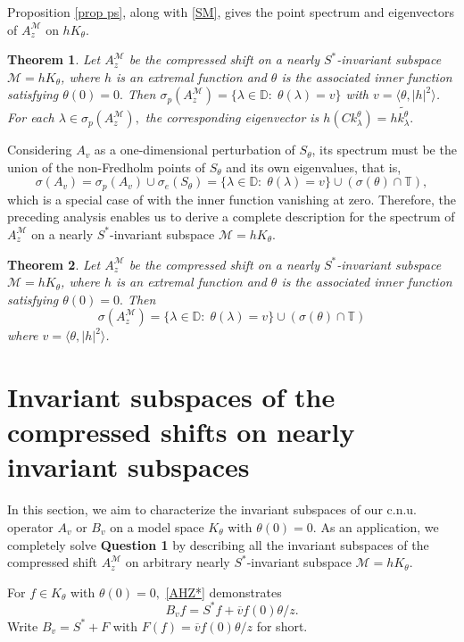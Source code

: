 \documentclass[12pt,reqno]{amsart}
\newtheorem{thm}{Theorem}[section]
\theoremstyle{definition}
\theoremstyle{remark}
\numberwithin{equation}{section}
\newcommand{\la}{\langle}
\newcommand{\ra}{\rangle}
\newcommand{\ol}{\overline}
\newcommand{\ma}{\mathcal}
\begin{document}
Proposition \ref{prop ps}, along with \eqref{SM}, gives the point spectrum and eigenvectors of $A_z^{\ma{M}}$ on $hK_\theta$.
\begin{thm}\label{thm ps}  Let $A_z^\ma{M}$ be the compressed shift on a nearly $S^*$-invariant subspace $\ma{M}=hK_\theta$, where $h$ is an extremal function and $\theta$ is the associated inner function satisfying $\theta(0)=0.$ Then $ \sigma_p(A_z^\ma{M})=\{\lambda\in \mathbb{D}:\;\theta(\lambda)= v \}$ with $v=\la \theta, |h|^2 \ra$. For each $\lambda\in \sigma_p(A_z^\ma{M}),$ the corresponding eigenvector is $h(Ck_\lambda^\theta)=h\widetilde{k_\lambda^\theta}.$\end{thm}

Considering $A_v$ as a one-dimensional perturbation of $S_\theta$, its spectrum must be the union of the  non-Fredholm points of $S_\theta$ and its own eigenvalues, that is,  $$ \sigma(A_v)=\sigma_p(A_v)\cup\sigma_{e}(S_\theta)=\{\lambda\in \mathbb{D}:\;\theta(\lambda)= v \}\cup (\sigma(\theta)\cap\mathbb{T}),$$ which is a special case of \cite[Theorem 14.1]{Sarason1} with the inner function vanishing at zero.  Therefore, the preceding analysis enables us to derive a complete description for the spectrum of $A_z^\ma{M}$ on a nearly $S^*$-invariant subspace $\ma{M}=hK_\theta$.

\begin{thm}\label{thm whole}  Let $A_z^\ma{M}$ be the compressed shift on a nearly $S^*$-invariant subspace $\ma{M}=hK_\theta$, where $h$ is an extremal function and $\theta$ is the associated inner function satisfying $\theta(0)=0.$ Then $$ \sigma(A_z^\ma{M})=\{\lambda\in \mathbb{D}:\;\theta(\lambda)= v \}\cup (\sigma(\theta)\cap\mathbb{T})$$  where $v=\la \theta, |h|^2 \ra$.\end{thm}




\section{Invariant subspaces of the compressed shifts on nearly invariant subspaces}
In this section, we aim to characterize the invariant subspaces of our c.n.u. operator $A_v$ or $B_v$  on  a model space $K_\theta$ with $\theta(0)=0$. As an application, we completely solve {\bf Question 1} by describing all the invariant subspaces of the compressed shift $A_z^\ma{M}$ on arbitrary nearly $S^*$-invariant subspace $\ma{M}=hK_\theta$.

For $f\in K_\theta$ with $\theta(0)=0,$ \eqref{AHZ*} demonstrates $$B_vf =S^*f+\ol{v}  f(0) \theta/z.$$
Write $B_v=S^*+F$ with $F(f)=\ol{v}f(0)\theta/z$ for short.
\end{document}
